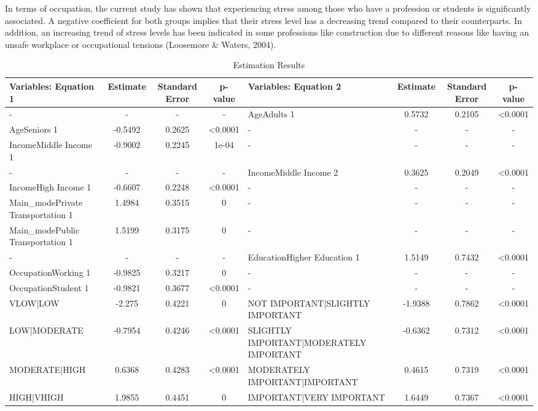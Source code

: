 \documentclass[
11pt, %
oneside, %
english, %
singlespacing, %
]{macthesis} %
\newcommand{\blandscape}{\begin{landscape}}
\newcommand{\elandscape}{\end{landscape}}
\begin{document}
In terms of occupation, the current study has shown that experiencing stress among those who have a profession or students is significantly associated. A negative coefficient for both groups implies that their stress level has a decreasing trend compared to their counterparts. In addition, an increasing trend of stress levels has been indicated in some professions like construction due to different reasons like having an unsafe workplace or occupational tensions (Loosemore \& Waters, 2004).

\newpage
\blandscape
\begin{table}

\caption{\label{tab:unnamed-chunk-35}\label{tab:Bivariate ordered model}Estimation Results}
\centering
\fontsize{8}{10}\selectfont
\begin{tabular}[t]{>{\raggedright\arraybackslash}p{10em}ccc>{\raggedright\arraybackslash}p{10em}ccc}
\toprule
Variables: Equation 1 & Estimate & Standard Error & p-value & Variables: Equation 2 & Estimate & Standard Error & p-value\\
\midrule
- & - & - & - & AgeAdults 1 & 0.5732 & 0.2105 & <0.0001\\
AgeSeniors 1 & -0.5492 & 0.2625 & <0.0001 & - & - & - & -\\
IncomeMiddle Income 1 & -0.9002 & 0.2245 & 1e-04 & - & - & - & -\\
- & - & - & - & IncomeMiddle Income 2 & 0.3625 & 0.2049 & <0.0001\\
IncomeHigh Income 1 & -0.6607 & 0.2248 & <0.0001 & - & - & - & -\\
\addlinespace
Main\_modePrivate Transportation 1 & 1.4984 & 0.3515 & 0 & - & - & - & -\\
Main\_modePublic Transportation 1 & 1.5199 & 0.3175 & 0 & - & - & - & -\\
- & - & - & - & EducationHigher Education 1 & 1.5149 & 0.7432 & <0.0001\\
OccupationWorking 1 & -0.9825 & 0.3217 & 0 & - & - & - & -\\
OccupationStudent 1 & -0.9821 & 0.3677 & <0.0001 & - & - & - & -\\
\addlinespace
VLOW|LOW & -2.275 & 0.4221 & 0 & NOT IMPORTANT|SLIGHTLY IMPORTANT & -1.9388 & 0.7862 & <0.0001\\
LOW|MODERATE & -0.7954 & 0.4246 & <0.0001 & SLIGHTLY IMPORTANT|MODERATELY IMPORTANT & -0.6362 & 0.7312 & <0.0001\\
MODERATE|HIGH & 0.6368 & 0.4283 & <0.0001 & MODERATELY IMPORTANT|IMPORTANT & 0.4615 & 0.7319 & <0.0001\\
HIGH|VHIGH & 1.9855 & 0.4451 & 0 & IMPORTANT|VERY IMPORTANT & 1.6449 & 0.7367 & <0.0001\\
\bottomrule
\end{tabular}
\end{table}
\elandscape
\newpage
\end{document}
